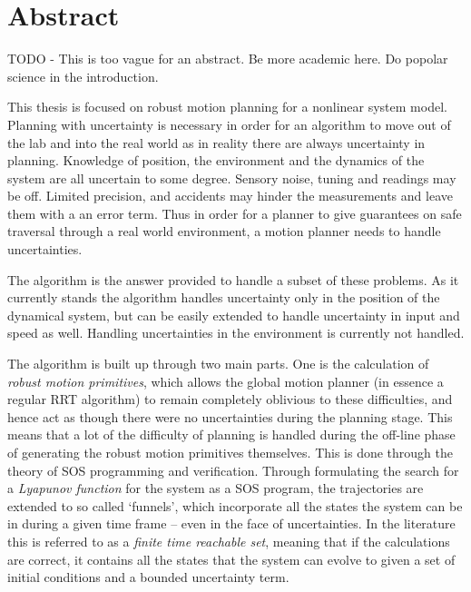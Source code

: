 \chapter{Abstract}

\abstractintoc{} %


TODO - This is too vague for an abstract. Be more academic here. Do popolar
science in the introduction.

This thesis is focused on robust motion planning for a nonlinear system model.
Planning with uncertainty is necessary in order for an algorithm to move out of
the lab and into the real world as in reality there are always uncertainty in
planning. Knowledge of position, the environment and the dynamics of the system
are all uncertain to some degree. Sensory noise, tuning and readings may be off.
Limited precision, and accidents may hinder the measurements and leave them with
a an error term. Thus in order for a planner to give guarantees on safe
traversal through a real world environment, a motion planner needs to handle
uncertainties.

The \rrtfunnel{} algorithm is the answer provided to handle a subset of these
problems. As it currently stands the algorithm handles uncertainty only in the
position of the dynamical system, but can be easily extended to handle
uncertainty in input and speed as well. Handling uncertainties in the
environment is currently not handled.

The algorithm is built up through two main parts. One is the calculation of
\textit{robust motion primitives}, which allows the global motion planner (in
essence a regular \ac{RRT} algorithm) to remain completely oblivious to these
difficulties, and hence act as though there were no uncertainties during the
planning stage. This means that a lot of the difficulty of planning is handled
during the off-line phase of generating the robust motion primitives themselves.
This is done through the theory of \ac{SOS} programming and verification.
Through formulating the search for a \textit{Lyapunov function} for the system
as a \ac{SOS} program, the trajectories are extended to so called `funnels',
which incorporate all the states the system can be in during a given time frame
-- even in the face of uncertainties. In the literature this is referred to as a
\textit{finite time reachable set}, meaning that if the calculations are
correct, it contains all the states that the system can evolve to given a set of
initial conditions and a bounded uncertainty term.

